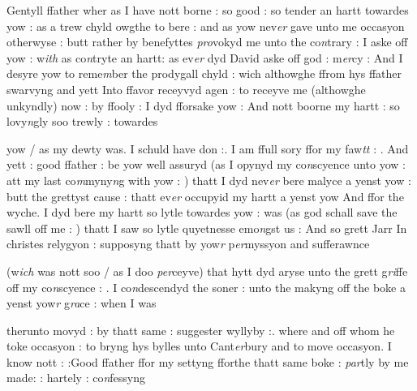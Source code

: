 \documentclass[12pt, a4paper]{book}
\begin{document}
      					
		\ifthenelse{\isodd{\thepage}}
		{\reversemarginpar}
		{\normalmarginpar}
		Gentyll ffather wher as I have nott borne : so good : so tender an hartt towardes yow : as a trew chyld owgthe to bere : and as yow nev\textit{er }gave unto me occasyon otherwyse : butt rather by benefyttes \textit{pro}vokyd me unto the co\textit{n}trary : I aske off yow : w\textit{ith} as co\textit{n}tryte an hartt: as ev\textit{er} dyd David aske off god : m\textit{er}cy : And I desyre yow to reme\textit{m}ber the prodygall chyld : wich althowghe ffrom hys ffather swarvyng and yett Into ffavor receyvyd agen : to receyve me (althowghe unkyndly) now : by ffooly : I dyd fforsake yow : And nott boorne my hartt : so lovy\textit{n}gly soo trewly : towardes 

	
				\marginpar[\vspace{0.5cm}{\textcolor{Gray}{n}}]{}
			
	
		\ifthenelse{\isodd{\thepage}}
		{\reversemarginpar}
		{\normalmarginpar}
		yow / as my dewty was. I schuld have don :. I am ffull sory ffor my faw\textit{tt} : . And yett : good ffather : be yow well assuryd (as I opynyd my co\textit{n}scyence unto yow : att my last co\textit{m}myny\textit{n}g with  yow : ) thatt I dyd nev\textit{er} bere malyce a yenst yow : butt the grettyst cause : thatt ev\textit{er} occupyid my hartt a yenst yow And ffor the wyche. I dyd bere my hartt so lytle towardes yow : was (as god schall save the sawll off me : ) thatt I saw so lytle quyetnesse emo\textit{n}gst us : And so grett Jarr In christes relygyon : supposyng thatt by yow\textit{r }p\textit{er}myssyon and sufferawnce 


	
				\marginpar[\vspace{0.5cm}{\textcolor{Gray}{IIII}}]{}
			
	
		\ifthenelse{\isodd{\thepage}}
		{\reversemarginpar}
		{\normalmarginpar}
		(w\textit{ich} was nott soo / as I doo \textit{per}ceyve) that hytt dyd aryse unto the grett g\textit{ri}ffe off my co\textit{n}scyence : . I co\textit{n}descendyd the soner : unto the makyng off the boke a yenst yow\textit{r} g\textit{ra}ce : when I was


	
				\marginpar[\vspace{0.5cm}{\textcolor{Gray}{wyllyby}}]{}
			
	
		\ifthenelse{\isodd{\thepage}}
		{\reversemarginpar}
		{\normalmarginpar}
		therunto movyd : by thatt same : suggester wyllyby :. where and off whom he toke occasyon : to bryng hys bylles unto Cant\textit{er}bury and to move occasyon. I know nott : :Good ffather ffor my settyng fforthe thatt same boke : \textit{par}tly by me made: : hartely : co\textit{n}fessyng
\end{document}
